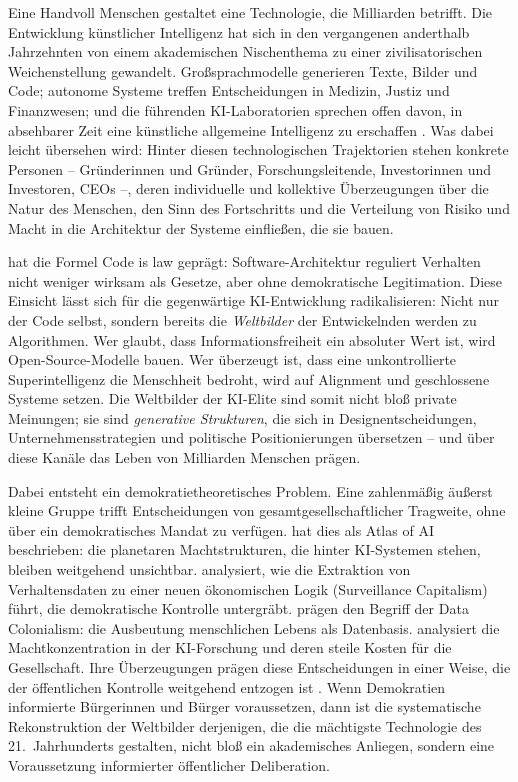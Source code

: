\documentclass[12pt,a4paper]{article}
\begin{document}
Eine Handvoll Menschen gestaltet eine Technologie, die Milliarden betrifft. Die Entwicklung k\"unstlicher Intelligenz hat sich in den vergangenen anderthalb Jahrzehnten von einem akademischen Nischenthema zu einer zivilisatorischen Weichenstellung gewandelt. Gro\ss{}sprachmodelle generieren Texte, Bilder und Code; autonome Systeme treffen Entscheidungen in Medizin, Justiz und Finanzwesen; und die f\"uhrenden KI-Laboratorien sprechen offen davon, in absehbarer Zeit eine k\"unstliche allgemeine Intelligenz zu erschaffen \citep{OpenAI2023Charter, AnthropicCoreViews2023, Bengio2024}. Was dabei leicht \"ubersehen wird: Hinter diesen technologischen Trajektorien stehen konkrete Personen -- Gr\"underinnen und Gr\"under, Forschungsleitende, Investorinnen und Investoren, CEOs --, deren individuelle und kollektive \"Uberzeugungen \"uber die Natur des Menschen, den Sinn des Fortschritts und die Verteilung von Risiko und Macht in die Architektur der Systeme einflie\ss{}en, die sie bauen.

\citet{Lessig1999} hat die Formel \glqq Code is law\grqq{} gepr\"agt: Software-Architektur reguliert Verhalten nicht weniger wirksam als Gesetze, aber ohne demokratische Legitimation. Diese Einsicht l\"asst sich f\"ur die gegenw\"artige KI-Entwicklung radikalisieren: Nicht nur der Code selbst, sondern bereits die \emph{Weltbilder} der Entwickelnden werden zu Algorithmen. Wer glaubt, dass Informationsfreiheit ein absoluter Wert ist, wird Open-Source-Modelle bauen. Wer \"uberzeugt ist, dass eine unkontrollierte Superintelligenz die Menschheit bedroht, wird auf Alignment und geschlossene Systeme setzen. Die Weltbilder der KI-Elite sind somit nicht blo\ss{} private Meinungen; sie sind \emph{generative Strukturen}, die sich in Designentscheidungen, Unternehmensstrategien und politische Positionierungen \"ubersetzen -- und \"uber diese Kan\"ale das Leben von Milliarden Menschen pr\"agen.

Dabei entsteht ein demokratietheoretisches Problem. Eine zahlenm\"a\ss{}ig \"au\ss{}erst kleine Gruppe trifft Entscheidungen von gesamtgesellschaftlicher Tragweite, ohne \"uber ein demokratisches Mandat zu verf\"ugen. \citet{Crawford2021} hat dies als \glqq Atlas of AI\grqq{} beschrieben: die planetaren Machtstrukturen, die hinter KI-Systemen stehen, bleiben weitgehend unsichtbar. \citet{Zuboff2019} analysiert, wie die Extraktion von Verhaltensdaten zu einer neuen \"okonomischen Logik (\glqq Surveillance Capitalism\grqq{}) f\"uhrt, die demokratische Kontrolle untergr\"abt. \citet{Couldry2019} pr\"agen den Begriff der \glqq Data Colonialism\grqq{}: die Ausbeutung menschlichen Lebens als Datenbasis. \citet{Whittaker2021} analysiert die Machtkonzentration in der KI-Forschung und deren \glqq steile Kosten\grqq{} f\"ur die Gesellschaft. Ihre \"Uberzeugungen pr\"agen diese Entscheidungen in einer Weise, die der \"offentlichen Kontrolle weitgehend entzogen ist \citep{Floridi2019, Floridi2023}. Wenn Demokratien informierte B\"urgerinnen und B\"urger voraussetzen, dann ist die systematische Rekonstruktion der Weltbilder derjenigen, die die m\"achtigste Technologie des 21.~Jahrhunderts gestalten, nicht blo\ss{} ein akademisches Anliegen, sondern eine Voraussetzung informierter \"offentlicher Deliberation.
\end{document}
